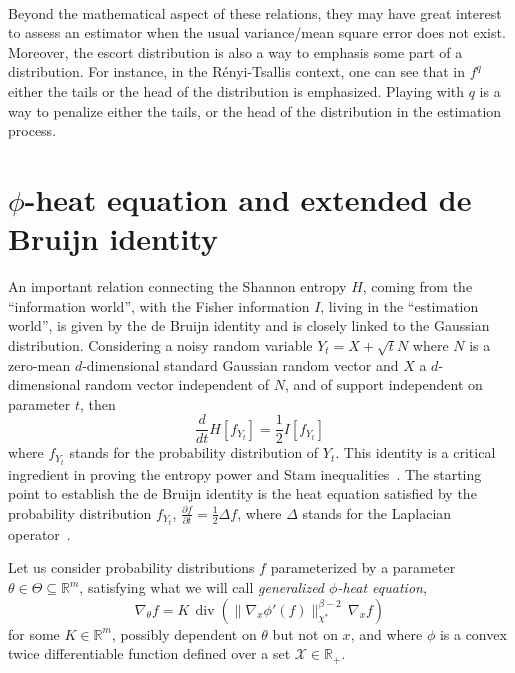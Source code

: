 \documentclass[entropy,article,submit,moreauthors,pdftex]{Definitions/mdpi}
\newcommand{\SZ}[1]{{\color{blue} #1}}                                       %
\def\Rset{\mathbb{R}}%
\def\X{\mathcal{X}}%
\def\div{\operatorname{div}}%
\begin{document}
\

Beyond the mathematical aspect of these  relations, they may have great interest
to  assess an  estimator  when the  usual variance/mean  square  error does  not
exist. Moreover, the escort distribution is also  a way to emphasis some part of
a distribution. For  instance, in the R\'enyi-Tsallis context, one  can see that
in $f^q$ either the tails or the head of the distribution is emphasized. Playing
with $q$ is a way to penalize either  the tails, or the head of the distribution
in the estimation process.




\section{$\phi$-heat equation and extended de Bruijn identity}
\label{sec:deBruijn}

An  important relation  connecting  the  Shannon entropy  $H$,  coming from  the
``information  world'',  with   the  Fisher  information  $I$,   living  in  the
``estimation world'', is  given by the de Bruijn identity  and is closely linked
to the  Gaussian distribution. Considering  a noisy random  variable $Y_t =  X +
\sqrt{t} N$  where $N$ is  a zero-mean $d$-dimensional standard  Gaussian random
vector  and $X$  a  $d$-dimensional random  vector independent  of  $N$, and  of
support independent on  parameter $t$, then $$\frac{d}{dt}  H[f_{Y_t}] = \frac12
I[f_{Y_t}]$$ where $f_{Y_t}$  stands for the probability  distribution of $Y_t$.
This identity  is a critical  ingredient in proving  the entropy power  and Stam
inequalities~\cite{CovTho06}.   The starting  point to  establish the  de Bruijn
identity  is  the  heat  equation  satisfied  by  the  probability  distribution
$f_{Y_t}$, $\frac{\partial  f}{\partial t} =  \frac12 \Delta f$,  where $\Delta$
stands for the Laplacian operator~\cite{Wid75}.


Let  us  consider probability  distributions  $f$  parameterized by  a  parameter
$\theta  \in  \Theta \subseteq  \Rset^m$,  satisfying  what  we will  call  {\em
  generalized $\phi$-heat equation},
%
\begin{equation}
\label{eq:phi-heat_equation}
\nabla_\theta f = K \, \div\left( \| \nabla_x \phi'(f) \|_{\chi^*}^{\beta-2}
\, \nabla_x f \right)
\end{equation}
%
for some  $K \in \Rset^m$, possibly  dependent on $\theta$ \SZ{but  not on $x$},
and where  $\phi$ is a convex  twice differentiable function defined  over a set
$\X \in \Rset_+$.
\end{document}
